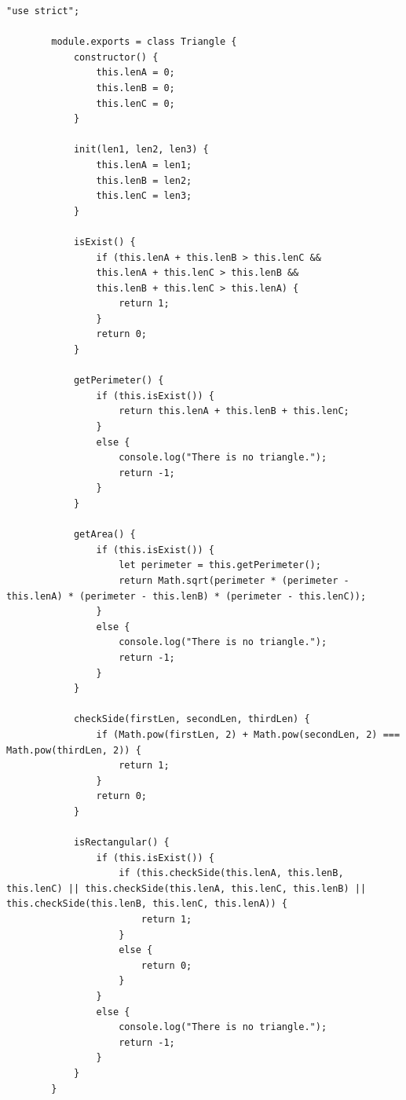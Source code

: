 \documentclass[12pt]{report}
\begin{document}
	\begin{lstlisting}[label=Task2.2,caption=Файл Triangle.js]
		"use strict";
		
		module.exports = class Triangle {
			constructor() {
				this.lenA = 0;
				this.lenB = 0;
				this.lenC = 0;
			}
			
			init(len1, len2, len3) {
				this.lenA = len1;
				this.lenB = len2;
				this.lenC = len3;
			}
			
			isExist() {
				if (this.lenA + this.lenB > this.lenC && 
				this.lenA + this.lenC > this.lenB &&
				this.lenB + this.lenC > this.lenA) {
					return 1;
				}
				return 0;
			}
			
			getPerimeter() {
				if (this.isExist()) {
					return this.lenA + this.lenB + this.lenC;
				}
				else {
					console.log("There is no triangle.");
					return -1;
				}
			}
			
			getArea() {
				if (this.isExist()) {
					let perimeter = this.getPerimeter();
					return Math.sqrt(perimeter * (perimeter - this.lenA) * (perimeter - this.lenB) * (perimeter - this.lenC));
				}
				else {
					console.log("There is no triangle.");
					return -1;
				}
			}
			
			checkSide(firstLen, secondLen, thirdLen) {
				if (Math.pow(firstLen, 2) + Math.pow(secondLen, 2) === Math.pow(thirdLen, 2)) {
					return 1;
				}
				return 0;
			}
			
			isRectangular() {
				if (this.isExist()) {
					if (this.checkSide(this.lenA, this.lenB, this.lenC) || this.checkSide(this.lenA, this.lenC, this.lenB) || this.checkSide(this.lenB, this.lenC, this.lenA)) {
						return 1;
					}
					else {
						return 0;
					}
				}
				else {
					console.log("There is no triangle.");
					return -1;
				}
			}
		}
	\end{lstlisting}
	
	\newpage
\end{document}
